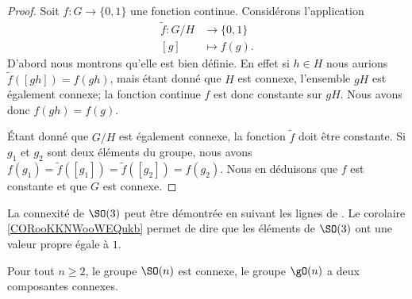 \begin{proof}
	Soit \( f\colon G\to \{ 0,1 \}\) une fonction continue. Considérons l'application
	\begin{equation}
		\begin{aligned}
			\tilde f\colon G/H & \to \{ 0,1 \} \\
			[g]                & \mapsto f(g).
		\end{aligned}
	\end{equation}
	D'abord nous montrons qu'elle est bien définie. En effet si \( h\in H\) nous aurions \( \tilde f([gh])=f(gh)\), mais étant donné que \( H\) est connexe, l'ensemble \( gH\) est également connexe; la fonction continue \( f\) est donc constante sur \( gH\). Nous avons donc \( f(gh)=f(g)\).

	Étant donné que \( G/H\) est également connexe, la fonction \( \tilde f\) doit être constante. Si \( g_1\) et \( g_2\) sont deux éléments du groupe, nous avons \( f(g_1)=\tilde f([g_1])=\tilde f([g_2])=f(g_2)\). Nous en déduisons que \( f\) est constante et que \( G\) est connexe.
\end{proof}

\begin{normaltext}
	La connexité de \( \SO(3)\) peut être démontrée en suivant les lignes de \cite{BIBooTMGMooRAJMcy}. Le corolaire \ref{CORooKKNWooWEQukb} permet de dire que les éléments de \( \SO(3)\) ont une valeur propre égale à \( 1\).
\end{normaltext}

\begin{theorem}     \label{THOooYQFNooPaYmaP}
	Pour tout \( n\geq 2\), le groupe \( \SO(n)\) est connexe, le groupe \( \gO(n)\) a deux composantes connexes.
\end{theorem}

